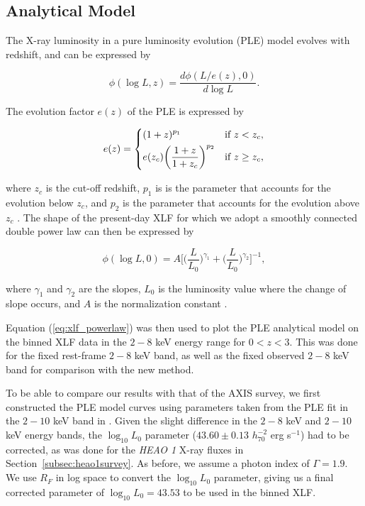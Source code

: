 \documentclass[fleqn,usenatbib]{mnras}
\begin{document}
		
	\subsection{Analytical Model}\label{subsec:analyticalmodel}  
	
	The X-ray luminosity in a pure luminosity evolution (PLE) model evolves with redshift, and can be expressed by 
	
		\begin{equation}\label{eq:xlf_ple}
		\phi(\log L,z) = \frac{d\phi(L / e(z), 0)}{d \log L}.
		\end{equation}
	
		\noindent The evolution factor $e(z)$ of the PLE is expressed by
	
		\begin{equation}\label{eq:e_z}
    		e(z) =
		\begin{dcases}
   		 	(1+z)^{p_{1}} & \text{if } z < z_{c},\\
    			e(z_{c})\bigg(\frac{1+z}{1+z_{c}}\bigg)^{p_{2}} & \text{if } z \geq z_{c},
		\end{dcases}
		\end{equation}
	
	\noindent where $z_c$ is the cut-off redshift, $p_1$ is is the parameter that accounts for the evolution below $z_c$, and $p_2$ is the parameter that accounts for the evolution above $z_c$ \citep{miyaji2000rosatxlf}. 
	The shape of the present-day XLF for which we adopt a smoothly connected double power law can then be expressed by
		
		\begin{equation}\label{eq:xlf_powerlaw}
		\phi(\log L,0) = A \Bigg[\bigg(\frac{L}{L_{0}} \bigg)^{\gamma_{1}} + \bigg(\frac{L}{L_{0}}\bigg)^{\gamma_{2}}\Bigg]^{-1},
		\end{equation}
	
	\noindent where $\gamma_1$ and $\gamma_2$ are the slopes, $L_0$ is the luminosity value where the change of slope occurs, and $A$ is the normalization constant \citep[e.g.][]{boyle1988qsoevolution,miyaji2000rosatxlf}. 
	
	Equation (\ref{eq:xlf_powerlaw}) was then used to plot the PLE analytical model on the binned XLF data in the $2-8$ keV energy range for $0 < z < 3$. 
	This was done for the fixed rest-frame $2-8$ keV band, as well as the fixed observed $2-8$ keV band for comparison with the new method.
	
	To be able to compare our results with that of the AXIS survey, we first constructed the PLE model curves using parameters taken from the PLE fit in the $2-10$ keV band in \cite{ebrero2009xmm}. 
	Given the slight difference in the $2-8$ keV and $2-10$ keV energy bands, the $\log_{10} L_{0}$ parameter ($43.60\pm0.13$ $h^{-2}_{70}$ erg s$^{-1}$) had to be corrected, as was done for the \textit{HEAO 1} X-ray fluxes in Section~\ref{subsec:heao1survey}. 
	As before, we assume a photon index of $\Gamma = 1.9$.
	We use $R_{F}$ in log space to convert the $\log_{10} L_{0}$ parameter, giving us a final corrected parameter of $\log_{10} L_{0} = 43.53$ to be used in the binned XLF.
\end{document}
